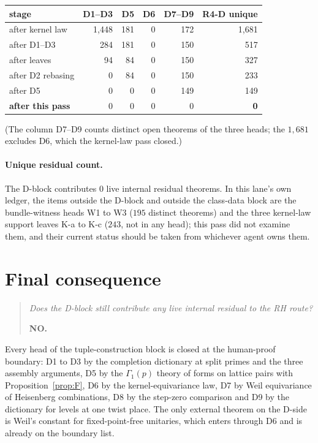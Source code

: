\documentclass[11pt]{article}
\newcommand{\rr}{\raggedright\arraybackslash}
\theoremstyle{definition}
\theoremstyle{remark}
\begin{document}
\begin{center}\small
\begin{tabular}{>{\rr}p{3.4cm}r r r r r}
\toprule
stage & D1--D3 & D5 & D6 & D7--D9 & R4-D unique\\
\midrule
after kernel law & 1{,}448 & 181 & 0 & 172 & 1{,}681\\
after D1--D3 & 284 & 181 & 0 & 150 & 517\\
after leaves & 94 & 84 & 0 & 150 & 327\\
after D2 rebasing & 0 & 84 & 0 & 150 & 233\\
after D5 & 0 & 0 & 0 & 149 & 149\\
\textbf{after this pass} & 0 & 0 & 0 & 0 & \textbf{0}\\
\bottomrule
\end{tabular}
\end{center}

\noindent (The column D7--D9 counts distinct open theorems of the three heads; the $1{,}681$ excludes D6, which the kernel-law pass closed.)

\paragraph{Unique residual count.} The D-block contributes $0$ live internal residual theorems. In this lane's own ledger, the items outside the D-block and outside the class-data block are the bundle-witness heads W1 to W3 ($195$ distinct theorems) and the three kernel-law support leaves K-a to K-c ($243$, not in any head); this pass did not examine them, and their current status should be taken from whichever agent owns them.

\section{Final consequence}

\begin{quote}
\emph{Does the D-block still contribute any live internal residual to the RH route?}

\textbf{NO.}
\end{quote}

\noindent Every head of the tuple-construction block is closed at the human-proof boundary: D1 to D3 by the completion dictionary at split primes and the three assembly arguments, D5 by the $\Gamma_1(p)$ theory of forms on lattice pairs with Proposition~\ref{prop:F}, D6 by the kernel-equivariance law, D7 by Weil equivariance of Heisenberg combinations, D8 by the step-zero comparison and D9 by the dictionary for levels at one twist place. The only external theorem on the D-side is Weil's constant for fixed-point-free unitaries, which enters through D6 and is already on the boundary list.
\end{document}
